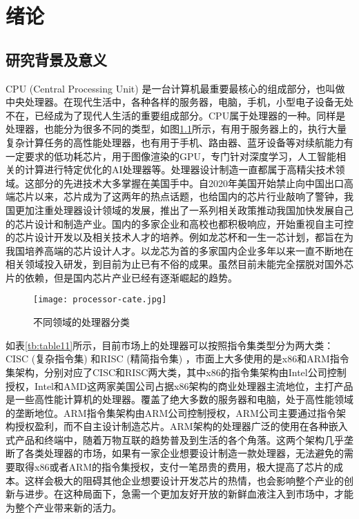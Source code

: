 
\chapter{绪论}

\section{研究背景及意义}
CPU (Central Processing Unit) 是一台计算机最重要最核心的组成部分，也叫做中央处理器。在现代生活中，各种各样的服务器，电脑，手机，小型电子设备无处不在，已经成为了现代人生活的重要组成部分。CPU属于处理器的一种。同样是处理器，也能分为很多不同的类型，如图\ref{fig:figure14}所示，有用于服务器上的，执行大量复杂计算任务的高性能处理器，也有用于手机、路由器、蓝牙设备等对续航能力有一定要求的低功耗芯片，用于图像渲染的GPU，专门针对深度学习，人工智能相关的计算进行特定优化的AI处理器等。处理器设计制造一直都属于高精尖技术领域。这部分的先进技术大多掌握在美国手中。自2020年美国开始禁止向中国出口高端芯片以来，芯片成为了这两年的热点话题，也给国内的芯片行业敲响了警钟，我国更加注重处理器设计领域的发展，推出了一系列相关政策推动我国加快发展自己的芯片设计和制造产业。国内的多家企业和高校也都积极响应，开始重视自主可控的芯片设计开发以及相关技术人才的培养。例如龙芯杯和一生一芯计划\cite{ysyx}，都旨在为我国培养高端的芯片设计人才。以龙芯为首的多家国内企业多年以来一直不断地在相关领域投入研发，到目前为止已有不俗的成果。虽然目前未能完全摆脱对国外芯片的依赖，但是国内芯片产业已经有逐渐崛起的趋势。

\begin{figure}[htb]
    \centering
    \setlength\tabcolsep{3pt}  %
    \vspace{5pt} %
    \texttt{[image: processor-cate.jpg]}
    \caption{不同领域的处理器分类\cite{cpu-overview}}
    \label{fig:figure14}
\end{figure}

如表\ref{tb:table11}所示，目前市场上的处理器可以按照指令集类型分为两大类：CISC (复杂指令集) 和RISC (精简指令集) \cite{cpu-overview}，市面上大多使用的是x86和ARM指令集架构，分别对应了CISC和RISC两大类，其中x86的指令集架构由Intel公司控制授权，Intel和AMD这两家美国公司占据x86架构的商业处理器主流地位，主打产品是一些高性能计算机的处理器。覆盖了绝大多数的服务器和电脑，处于高性能领域的垄断地位。ARM指令集架构由ARM公司控制授权，ARM公司主要通过指令架构授权盈利，而不自主设计制造芯片。ARM架构的处理器广泛的使用在各种嵌入式产品和终端中，随着万物互联的趋势普及到生活的各个角落。这两个架构几乎垄断了各类处理器的市场，如果有一家企业想要设计制造一款处理器，无法避免的需要取得x86或者ARM的指令集授权，支付一笔昂贵的费用，极大提高了芯片的成本。这样会极大的阻碍其他企业想要设计开发芯片的热情，也会影响整个产业的创新与进步。在这种局面下，急需一个更加友好开放的新鲜血液注入到市场中，才能为整个产业带来新的活力。


